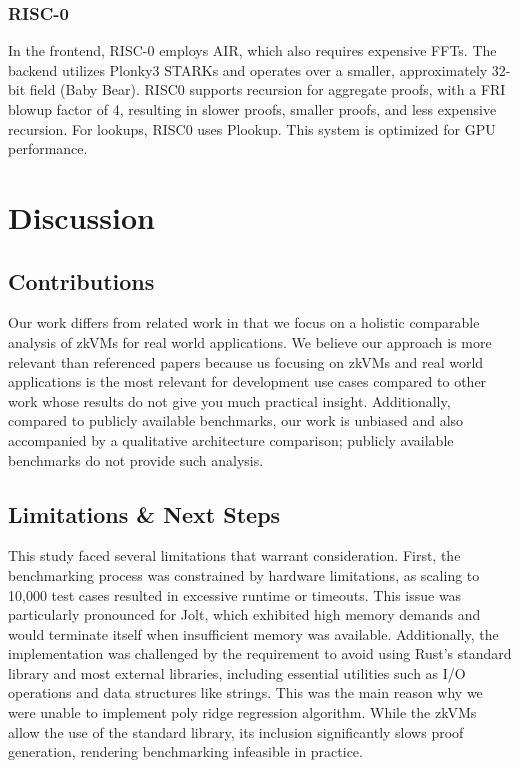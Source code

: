 \documentclass{scrartcl}
\begin{document}
\subsubsection{RISC-0}
In the frontend, RISC-0 employs AIR, which also requires expensive FFTs. The backend utilizes Plonky3 STARKs and operates over a smaller, approximately 32-bit field (Baby Bear). RISC0 supports recursion for aggregate proofs, with a FRI blowup factor of 4, resulting in slower proofs, smaller proofs, and less expensive recursion. For lookups, RISC0 uses Plookup. This system is optimized for GPU performance.

\section{Discussion}

\subsection{Contributions}
Our work differs from related work in that we focus on a holistic comparable analysis of zkVMs for real world applications. We believe our approach is more relevant than referenced papers because us focusing on zkVMs and real world applications is the most relevant for development use cases compared to other work whose results do not give you much practical insight. Additionally, compared to publicly available benchmarks, our work is unbiased and also accompanied by a qualitative architecture comparison; publicly available benchmarks do not provide such analysis.

\subsection{Limitations \& Next Steps}
This study faced several limitations that warrant consideration. First, the benchmarking process was constrained by hardware limitations, as scaling to 10,000 test cases resulted in excessive runtime or timeouts. This issue was particularly pronounced for Jolt, which exhibited high memory demands and would terminate itself when insufficient memory was available. Additionally, the implementation was challenged by the requirement to avoid using Rust’s standard library and most external libraries, including essential utilities such as I/O operations and data structures like strings. This was the main reason why we were unable to implement poly ridge regression algorithm. While the zkVMs allow the use of the standard library, its inclusion significantly slows proof generation, rendering benchmarking infeasible in practice.
\end{document}
